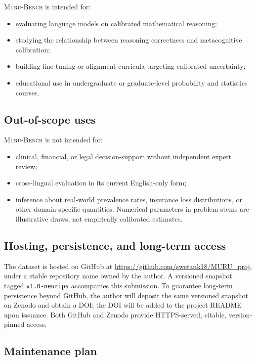\documentclass{article}
\newcommand{\muru}{\textsc{Muru-Bench}}
\begin{document}
\muru{} is intended for:
\begin{itemize}[leftmargin=*,itemsep=2pt]
    \item evaluating language models on calibrated mathematical reasoning;
    \item studying the relationship between reasoning correctness and metacognitive calibration;
    \item building fine-tuning or alignment curricula targeting calibrated uncertainty;
    \item educational use in undergraduate or graduate-level probability and statistics courses.
\end{itemize}

\subsection*{Out-of-scope uses}

\muru{} is not intended for:
\begin{itemize}[leftmargin=*,itemsep=2pt]
    \item clinical, financial, or legal decision-support without independent expert review;
    \item cross-lingual evaluation in its current English-only form;
    \item inference about real-world prevalence rates, insurance loss distributions, or other domain-specific quantities. Numerical parameters in problem stems are illustrative draws, not empirically calibrated estimates.
\end{itemize}

\subsection*{Hosting, persistence, and long-term access}

The dataset is hosted on GitHub at \url{https://github.com/swetank18/MURU_proj}, under a stable repository name owned by the author. A versioned snapshot tagged \texttt{v1.0-neurips} accompanies this submission. To guarantee long-term persistence beyond GitHub, the author will deposit the same versioned snapshot on Zenodo and obtain a DOI; the DOI will be added to the project README upon issuance. Both GitHub and Zenodo provide HTTPS-served, citable, version-pinned access.

\subsection*{Maintenance plan}
\end{document}
